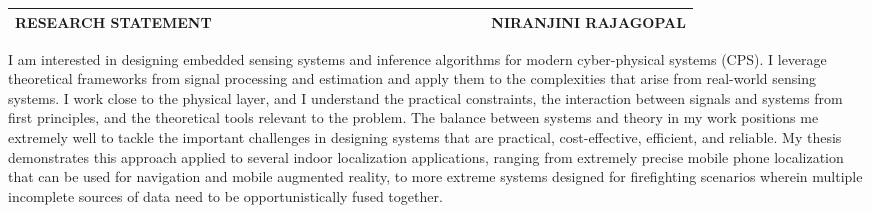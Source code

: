 \documentclass[10pt]{article}
\date{}
\begin{document}


\begin{table}
\color{blue}
\begin{tabular*}{\textwidth}{l r}
\large\textbf{RESEARCH STATEMENT} & 
\hfill \ \ \ \ \ \ \ \ \ \ \ \ \ \ \ \ \ \ \ \
\ \ \ \ \ \ \ \ \ \ \ \ \ 
\large\textbf{NIRANJINI RAJAGOPAL}\\
\hline
\end{tabular*}

\end{table}
 
I am interested in designing  embedded sensing systems and inference algorithms for modern cyber-physical systems (CPS). 
I leverage theoretical frameworks from signal processing and estimation and apply them to the complexities that arise from real-world sensing systems. 
I work close to the physical layer, and I understand the practical constraints, the interaction between signals and systems from first principles, and the theoretical tools relevant to the problem. 
The balance between systems and theory in my work positions me extremely well to tackle the important challenges in designing systems that are practical, cost-effective, efficient, and reliable. My thesis demonstrates this approach applied to several indoor localization applications, ranging from extremely precise mobile phone localization that can be used for navigation and mobile augmented reality, to more extreme systems designed for firefighting scenarios wherein multiple incomplete sources of data need to be opportunistically fused together. 

\end{document}
